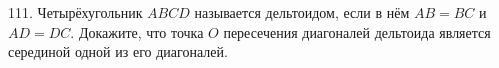 111. Четырёхугольник $ABCD$ называется дельтоидом, если в нём $AB=BC$ и $AD=DC.$ Докажите, что точка $O$ пересечения диагоналей дельтоида является серединой одной из его диагоналей. \\
